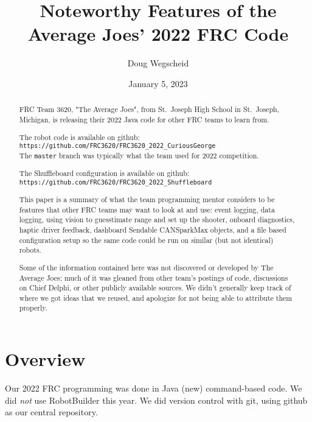 \documentclass[]{article}
\title{Noteworthy Features of the Average Joes' 2022 FRC Code}
\author{Doug Wegscheid}
\date{January 5, 2023}
\newcommand{\zztt}[1]{{\texttt{\footnotesize{#1}}}}
\begin{document}
\maketitle

\begin{abstract}

\iffalse	
\
\\
\texttt{hi()}
\\
\texttt{\small{hi()}}
\\
\texttt{\scriptsize{hi()}}
\\
\texttt{\tiny{hi()}}
\\
\zztt{hi()}
\fi

FRC Team 3620, "The Average Joes", from St.\ Joseph High School in St.\ Joseph, Michigan, is releasing their 2022 Java code for other FRC teams to learn from.

The robot code is available on github:
\\
\zztt{https://github.com/FRC3620/FRC3620\_2022\_CuriousGeorge}
\\
The \zztt{master} branch was typically what the team used for 2022 competition.

The Shuffleboard configuration is available on github:
\\
\zztt{https://github.com/FRC3620/FRC3620\_2022\_Shuffleboard}

This paper is a summary of what the team programming mentor considers to be features that other FRC teams may want to look at and use: 
event logging, data logging,
using vision to guesstimate range and set up the shooter,
onboard diagnostics,
haptic driver feedback,
dashboard Sendable CANSparkMax objects,
and a file based configuration setup so the same code could be run on similar (but not identical) robots.

Some of the information contained here was not discovered or developed by The Average Joes; much of it was gleaned from other team's postings of code, discussions on Chief Delphi, or other publicly available sources.
We didn't generally keep track of where we got ideas that we reused, and apologize for not being able to attribute them properly.

\end{abstract}

\section{Overview}

Our 2022 FRC programming was done in Java (new) command-based code. We did \emph{not} use RobotBuilder this year.
We did version control with git, using github as our central repository.
\end{document}
